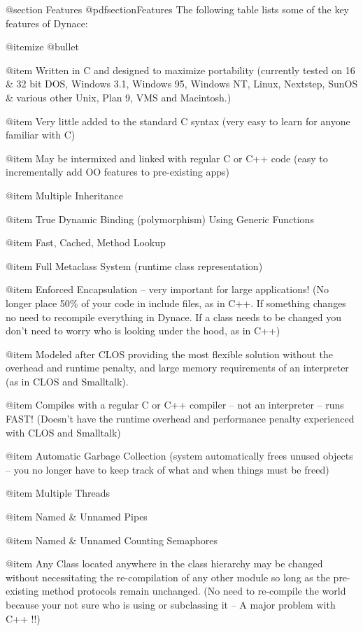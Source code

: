 @section Features
@pdfsection{Features}
The following table lists some of the key features of Dynace:

@itemize @bullet

@item Written in C and designed to maximize portability (currently tested
on 16 & 32 bit DOS, Windows 3.1, Windows 95, Windows NT, Linux, Nextstep,
SunOS & various other Unix, Plan 9, VMS and Macintosh.)

@item Very little added to the standard C syntax (very easy to learn for
anyone familiar with C)

@item May be intermixed and linked with regular C or C++ code (easy to
incrementally add OO features to pre-existing apps)

@item Multiple Inheritance

@item True Dynamic Binding (polymorphism) Using Generic Functions

@item Fast, Cached, Method Lookup

@item Full Metaclass System (runtime class representation)

@item Enforced Encapsulation -- very important for large 
applications!  (No longer place 50\% of your code in include files, as
in C++. If something changes no need to recompile everything in
Dynace.  If a class needs to be changed you don't need to worry who is
looking under the hood, as in C++)

@item Modeled after CLOS providing the most flexible
solution without the overhead and runtime penalty, and large memory
requirements of an interpreter (as in CLOS and Smalltalk).

@item Compiles with a regular C or C++ compiler -- not an interpreter -- 
runs FAST!  (Doesn't have the runtime overhead and performance penalty
experienced with CLOS and Smalltalk)

@item Automatic Garbage Collection (system automatically frees unused
objects -- you no longer have to keep track of what and when things
must be freed)

@item Multiple Threads

@item Named & Unnamed Pipes

@item Named & Unnamed Counting Semaphores

@item Any Class located anywhere in the class hierarchy may be changed without
necessitating the re-compilation of any other module so long as the
pre-existing method protocols remain unchanged. (No need to re-compile
the world because your not sure who is using or subclassing it -- A
major problem with C++ !!)

